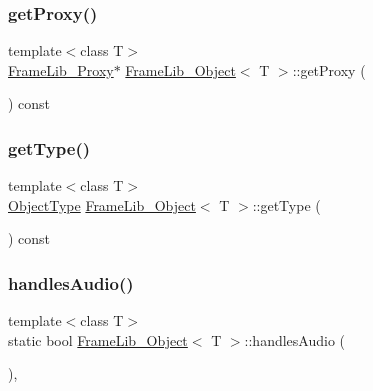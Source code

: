\mbox{\label{class_frame_lib___object_a9aa8f7f487999748f04c39ea2692a8ed}} 
\subsubsection{\texorpdfstring{get\+Proxy()}{getProxy()}}
{\footnotesize\ttfamily template$<$class T$>$ \\
\hyperlink{struct_frame_lib___proxy}{Frame\+Lib\+\_\+\+Proxy}$\ast$ \hyperlink{class_frame_lib___object}{Frame\+Lib\+\_\+\+Object}$<$ T $>$\+::get\+Proxy (\begin{DoxyParamCaption}{ }\end{DoxyParamCaption}) const\hspace{0.3cm}{\ttfamily [inline]}}

\mbox{\label{class_frame_lib___object_a8d96d1f55054e583a99891ad65f84a3a}} 
\subsubsection{\texorpdfstring{get\+Type()}{getType()}}
{\footnotesize\ttfamily template$<$class T$>$ \\
\hyperlink{_frame_lib___types_8h_a842c5e2e69277690b064bf363c017980}{Object\+Type} \hyperlink{class_frame_lib___object}{Frame\+Lib\+\_\+\+Object}$<$ T $>$\+::get\+Type (\begin{DoxyParamCaption}{ }\end{DoxyParamCaption}) const\hspace{0.3cm}{\ttfamily [inline]}}

\mbox{\label{class_frame_lib___object_a3d8517596d7598585c08af375dae79b9}} 
\subsubsection{\texorpdfstring{handles\+Audio()}{handlesAudio()}}
{\footnotesize\ttfamily template$<$class T$>$ \\
static bool \hyperlink{class_frame_lib___object}{Frame\+Lib\+\_\+\+Object}$<$ T $>$\+::handles\+Audio (\begin{DoxyParamCaption}{ }\end{DoxyParamCaption})\hspace{0.3cm}{\ttfamily [inline]}, {\ttfamily [static]}}

